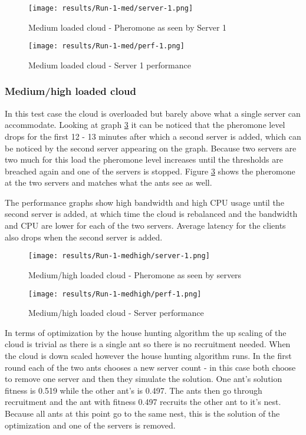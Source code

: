 \begin{figure}
	\centering
		\texttt{[image: results/Run-1-med/server-1.png]}
	\caption{Medium loaded cloud - Pheromone as seen by Server 1}
	\label{fig:1serv-pher-med}
\end{figure}

\begin{figure}
	\centering
		\texttt{[image: results/Run-1-med/perf-1.png]}
	\caption{Medium loaded cloud - Server 1 performance}
	\label{fig:1serv-perf-med}
\end{figure}

\subsubsection{Medium/high loaded cloud}

In this test case the cloud is overloaded but barely above what a single server can accommodate. Looking at graph \ref{fig:1serv-pher-medhigh} it can be noticed that the pheromone level drops for the first 12 - 13 minutes after which a second server is added, which can be noticed by the second server appearing on the graph.  Because two servers are two much for this load the pheromone level increases until the thresholds are breached again and one of the servers is stopped. Figure \ref{fig:1serv-pher-medhigh} shows the pheromone at the two servers and matches what the ants see as well.

The performance graphs show high bandwidth and high CPU usage until the second server is added, at which time the cloud is rebalanced and the bandwidth and CPU are lower for each of the two servers. Average latency for the clients also drops when the second server is added.

\begin{figure}
	\centering
		\texttt{[image: results/Run-1-medhigh/server-1.png]}
	\caption{Medium/high loaded cloud - Pheromone as seen by servers}
	\label{fig:1serv-pher-medhigh}
\end{figure}

\begin{figure}
	\centering
		\texttt{[image: results/Run-1-medhigh/perf-1.png]}
	\caption{Medium/high loaded cloud - Server performance}
	\label{fig:1serv-perf-medhigh}
\end{figure}

In terms of optimization by the house hunting algorithm the up scaling of the cloud is trivial as there is a single ant so there is no recruitment needed. When the cloud is down scaled however the house hunting algorithm runs. In the first round each of the two ants chooses a new server count - in this case both choose to remove one server and then they simulate the solution. One ant's solution fitness is 0.519 while the other ant's is 0.497. The ants then go through recruitment and the ant with fitness 0.497 recruits the other ant to it's nest. Because all ants at this point go to the same nest, this is the solution of the optimization and one of the servers is removed.

